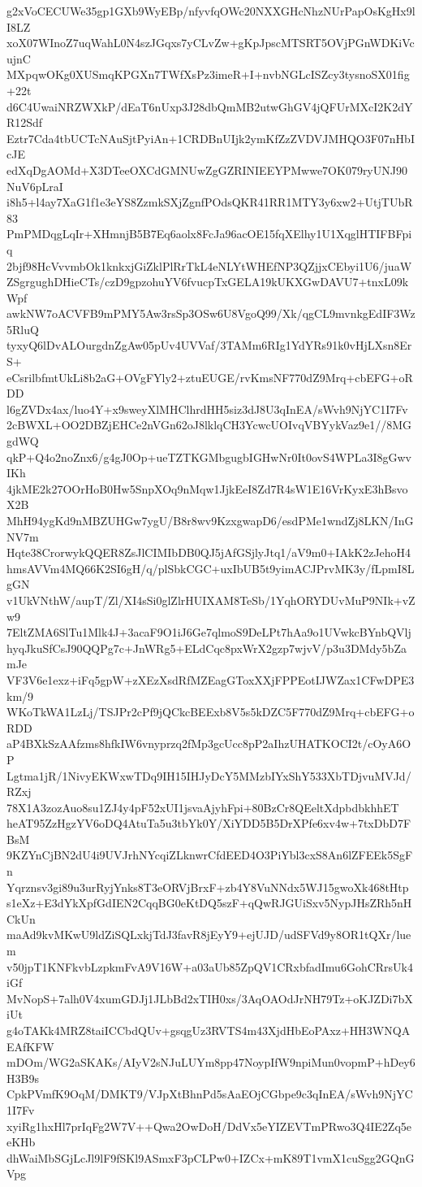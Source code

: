 g2xVoCECUWe35gp1GXb9WyEBp/nfyvfqOWc20NXXGHcNhzNUrPapOsKgHx9lI8LZ
xoX07WInoZ7uqWahL0N4szJGqxs7yCLvZw+gKpJpscMTSRT5OVjPGnWDKiVcujnC
MXpqwOKg0XUSmqKPGXn7TWfXsPz3imeR+I+nvbNGLcISZcy3tysnoSX01fig+22t
d6C4UwaiNRZWXkP/dEaT6nUxp3J28dbQmMB2utwGhGV4jQFUrMXcI2K2dYR12Sdf
Eztr7Cda4tbUCTcNAuSjtPyiAn+1CRDBnUIjk2ymKfZzZVDVJMHQO3F07nHbIcJE
edXqDgAOMd+X3DTeeOXCdGMNUwZgGZRINIEEYPMwwe7OK079ryUNJ90NuV6pLraI
i8h5+l4ay7XaG1f1e3eYS8ZzmkSXjZgnfPOdsQKR41RR1MTY3y6xw2+UtjTUbR83
PmPMDqgLqIr+XHmnjB5B7Eq6aolx8FcJa96acOE15fqXElhy1U1XqglHTIFBFpiq
2bjf98HcVvvmbOk1knkxjGiZklPlRrTkL4eNLYtWHEfNP3QZjjxCEbyi1U6/juaW
ZSgrgughDHieCTs/czD9gpzohuYV6fvucpTxGELA19kUKXGwDAVU7+tnxL09kWpf
awkNW7oACVFB9mPMY5Aw3rsSp3OSw6U8VgoQ99/Xk/qgCL9mvnkgEdIF3Wz5RluQ
tyxyQ6lDvALOurgdnZgAw05pUv4UVVaf/3TAMm6RIg1YdYRs91k0vHjLXsn8ErS+
eCsrilbfmtUkLi8b2aG+OVgFYly2+ztuEUGE/rvKmsNF770dZ9Mrq+cbEFG+oRDD
l6gZVDx4ax/luo4Y+x9sweyXlMHClhrdHH5siz3dJ8U3qInEA/sWvh9NjYC1I7Fv
2cBWXL+OO2DBZjEHCe2nVGn62oJ8lklqCH3YcwcUOIvqVBYykVaz9e1//8MGgdWQ
qkP+Q4o2noZnx6/g4gJ0Op+ueTZTKGMbgugbIGHwNr0It0ovS4WPLa3I8gGwvIKh
4jkME2k27OOrHoB0Hw5SnpXOq9nMqw1JjkEeI8Zd7R4sW1E16VrKyxE3hBsvoX2B
MhH94ygKd9nMBZUHGw7ygU/B8r8wv9KzxgwapD6/esdPMe1wndZj8LKN/InGNV7m
Hqte38CrorwykQQER8ZsJlCIMIbDB0QJ5jAfGSjlyJtq1/aV9m0+IAkK2zJehoH4
hmsAVVm4MQ66K2SI6gH/q/plSbkCGC+uxIbUB5t9yimACJPrvMK3y/fLpmI8LgGN
v1UkVNthW/aupT/Zl/XI4sSi0glZlrHUIXAM8TeSb/1YqhORYDUvMuP9NIk+vZw9
7EltZMA6SlTu1Mlk4J+3acaF9O1iJ6Ge7qlmoS9DeLPt7hAa9o1UVwkcBYnbQVlj
hyqJkuSfCsJ90QQPg7c+JnWRg5+ELdCqc8pxWrX2gzp7wjvV/p3u3DMdy5bZamJe
VF3V6e1exz+iFq5gpW+zXEzXsdRfMZEagGToxXXjFPPEotIJWZax1CFwDPE3km/9
WKoTkWA1LzLj/TSJPr2cPf9jQCkcBEExb8V5s5kDZC5F770dZ9Mrq+cbEFG+oRDD
aP4BXkSzAAfzms8hfkIW6vnyprzq2fMp3gcUcc8pP2aIhzUHATKOCI2t/cOyA6OP
Lgtma1jR/1NivyEKWxwTDq9IH15IHJyDcY5MMzbIYxShY533XbTDjvuMVJd/RZxj
78X1A3zozAuo8su1ZJ4y4pF52xUI1jsvaAjyhFpi+80BzCr8QEeltXdpbdbkhhET
heAT95ZzHgzYV6oDQ4AtuTa5u3tbYk0Y/XiYDD5B5DrXPfe6xv4w+7txDbD7FBsM
9KZYnCjBN2dU4i9UVJrhNYcqiZLknwrCfdEED4O3PiYbl3cxS8An6lZFEEk5SgFn
Yqrznsv3gi89u3urRyjYnks8T3eORVjBrxF+zb4Y8VuNNdx5WJ15gwoXk468tHtp
s1eXz+E3dYkXpfGdIEN2CqqBG0eKtDQ5szF+qQwRJGUiSxv5NypJHsZRh5nHCkUn
maAd9kvMKwU9ldZiSQLxkjTdJ3favR8jEyY9+ejUJD/udSFVd9y8OR1tQXr/luem
v50jpT1KNFkvbLzpkmFvA9V16W+a03aUb85ZpQV1CRxbfadImu6GohCRrsUk4iGf
MvNopS+7alh0V4xumGDJj1JLbBd2xTIH0xs/3AqOAOdJrNH79Tz+oKJZDi7bXiUt
g4oTAKk4MRZ8taiICCbdQUv+gsqgUz3RVTS4m43XjdHbEoPAxz+HH3WNQAEAfKFW
mDOm/WG2aSKAKs/AIyV2sNJuLUYm8pp47NoypIfW9npiMun0vopmP+hDey6H3B9s
CpkPVmfK9OqM/DMKT9/VJpXtBhnPd5sAaEOjCGbpe9c3qInEA/sWvh9NjYC1I7Fv
xyiRg1hxHl7prIqFg2W7V++Qwa2OwDoH/DdVx5eYIZEVTmPRwo3Q4IE2Zq5eeKHb
dhWaiMbSGjLcJl9lF9fSKl9ASmxF3pCLPw0+IZCx+mK89T1vmX1cuSgg2GQnGVpg
